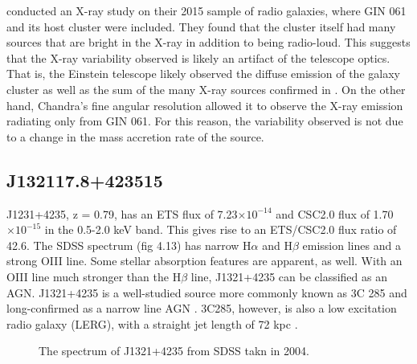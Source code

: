 \cite{baldi2015} conducted an X-ray study on their 2015 sample of radio galaxies, where GIN 061 and its host cluster were included.
They found that the cluster itself had many sources that are bright in the X-ray in addition to being radio-loud. 
This suggests that the X-ray variability observed is likely an artifact of the telescope optics. 
That is, the Einstein telescope likely observed the diffuse emission of the galaxy cluster as well as the sum of the many X-ray sources confirmed in \cite{baldi2015}.
On the other hand, Chandra’s fine angular resolution allowed it to observe the X-ray emission radiating only from GIN 061. 
For this reason, the variability observed is not due to a change in the mass accretion rate of the source.


\FloatBarrier




\subsection{J132117.8+423515}

J1231+4235, z = 0.79, has an ETS flux of 7.23$\times 10^{-14}$  \fluxunits and CSC2.0 flux of 1.70$\times 10^{-15}$ \fluxunits in the 0.5-2.0 keV band. 
This gives rise to an ETS/CSC2.0 flux ratio of 42.6. 
The SDSS spectrum (fig 4.13) has narrow H$\alpha$ and H$\beta$ emission lines and a strong OIII line. 
Some stellar absorption features are apparent, as well.
With an OIII line much stronger than the H$\beta$ line, J1321+4235 can be classified as an AGN.
J1321+4235 is a well-studied source more commonly known as 3C 285 and long-confirmed as a narrow line AGN \citep{fabiano1984}. 
3C285, however, is also a low excitation radio galaxy (LERG), with a straight jet length of 72 kpc \citep{krause2019}.

\begin{figure}[h]
\centering
{}
\caption{The spectrum of J1321+4235 from SDSS takn in 2004.}
\label{imbeded_fb}
\end{figure}


